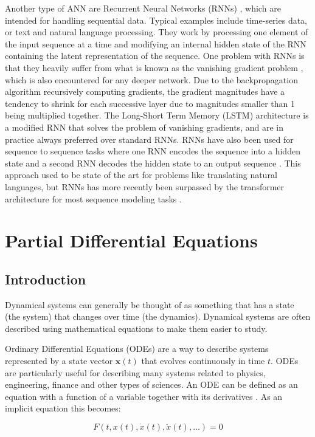 Another type of ANN are Recurrent Neural Networks (RNNs) \cite{deeplearningnature}, which are intended for handling sequential data. Typical examples include time-series data, or text and natural language processing. They work by processing one element of the input sequence at a time and modifying an internal hidden state of the RNN containing the latent representation of the sequence. One problem with RNNs is that they heavily suffer from what is known as the vanishing gradient problem \cite{vanishinggradients}, which is also encountered for any deeper network. Due to the backpropagation algorithm recursively computing gradients, the gradient magnitudes have a tendency to shrink for each successive layer due to magnitudes smaller than 1 being multiplied together. The Long-Short Term Memory (LSTM) architecture is a modified RNN that solves the problem of vanishing gradients, and are in practice always preferred over standard RNNs. RNNs have also been used for sequence to sequence tasks where one RNN encodes the sequence into a hidden state and a second RNN decodes the hidden state to an output sequence \cite{seqtoseq}. This approach used to be state of the art for problems like translating natural languages, but RNNs has more recently been surpassed by the transformer architecture for most sequence modeling tasks \cite{attention}.

\section{Partial Differential Equations}

\subsection{Introduction}

Dynamical systems can generally be thought of as something that has a state (the system) that changes over time (the dynamics). Dynamical systems are often described using mathematical equations to make them easier to study.

Ordinary Differential Equations (ODEs) are a way to describe systems represented by a state vector $\bm{x}(t)$ that evolves continuously in time $t$. ODEs are particularly useful for describing many systems related to physics, engineering, finance and other types of sciences. An ODE can be defined as an equation with a function of a variable together with its derivatives \cite{odebook}. As an implicit equation this becomes:

\begin{equation}
    F(t, x(t), \dot{x}(t), \ddot{x}(t), \dots) = 0
\end{equation}

